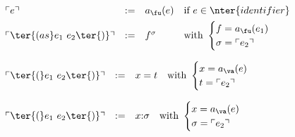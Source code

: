 \noindent {} \\

\(
\begin{array}{llll}
 \tr{e} & := & a_{\fu}(e)
 & \text{if } e \in \nter{identifier}
 \\[1ex]
 \tr{\ter{(as } e_1\ e_2 \ter{)}}  & := & f^\sigma &
 \text{with } \begin{cases}f = a_{\fu}(e_1)\\ \sigma = \tr{e_2}\end{cases}
\end{array}
\)
\bigskip

\noindent {}

\(
\begin{array}{llll}
 \tr{\ter{(} e_1\ e_2 \ter{)}}  & := & x = t
 & \text{with } \begin{cases}x = a_{\va}(e)\\ t = \tr{e_2}\end{cases}
\end{array}
\)
\bigskip

\noindent {}

\(
\begin{array}{llll}
 \tr{\ter{(} e_1\ e_2 \ter{)}}  & := & x{:}\sigma
 & \text{with } \begin{cases} x = a_{\va}(e)\\ \sigma = \tr{e_2}\end{cases}
\end{array}
\)
\bigskip

\newpage
\noindent 
{}\\

